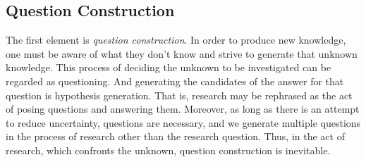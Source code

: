 





\subsection{Question Construction}

The first element is \textit{question construction}. In order to produce new knowledge, one must be aware of what they don't know and strive to generate that unknown knowledge. This process of deciding the unknown to be investigated can be regarded as questioning. And generating the candidates of the answer for that question is hypothesis generation. That is, research may be rephrased as the act of posing questions and answering them. Moreover, as long as there is an attempt to reduce uncertainty, questions are necessary, and we generate multiple questions in the process of research other than the research question. Thus, in the act of research, which confronts the unknown, question construction is inevitable.

